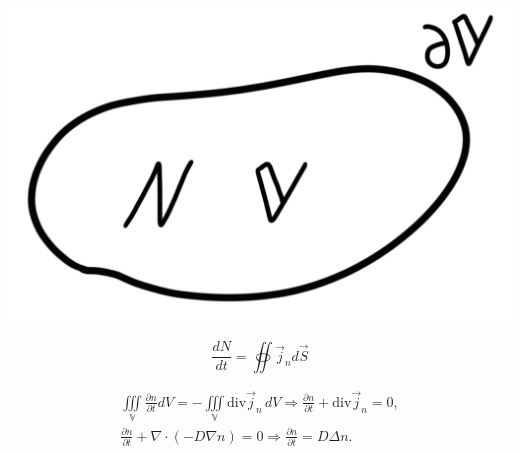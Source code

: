 \begin{minipage}[c]{0.2\textwidth} %
    \includegraphics[width=\textwidth]{im/92.png}%
\end{minipage}%
\hfill
\begin{minipage}[c]{0.6\textwidth} %
   \[
   \frac{dN}{dt}=\oiint \vec{j}_nd\vec{S}
   \]
\end{minipage}

\begin{gather*}
    \underset{\mathbb{V}}{\iiint} \frac{\partial n}{\partial t} dV=-\underset{\mathbb{V}}{\iiint}\mathrm{div}\vec{j}_n \, dV \Rightarrow \frac{\partial n}{\partial t}+\mathrm{div}\vec{j}_n=0, \\
    \frac{\partial n}{\partial t} + \nabla \cdot (-D \nabla n) = 0 \Rightarrow \boxed{\frac{\partial n}{\partial t} = D \Delta n}.
\end{gather*}